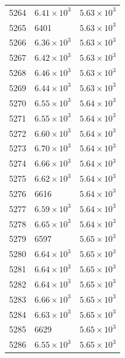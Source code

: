 \begin{table}[H]
\begin{tabular}{lll}
5264 & $\displaystyle 6.41 \times 10^{3}$ & $\displaystyle 5.63 \times 10^{3}$ \\
5265 & 6401 & $\displaystyle 5.63 \times 10^{3}$ \\
5266 & $\displaystyle 6.36 \times 10^{3}$ & $\displaystyle 5.63 \times 10^{3}$ \\
5267 & $\displaystyle 6.42 \times 10^{3}$ & $\displaystyle 5.63 \times 10^{3}$ \\
5268 & $\displaystyle 6.46 \times 10^{3}$ & $\displaystyle 5.63 \times 10^{3}$ \\
5269 & $\displaystyle 6.44 \times 10^{3}$ & $\displaystyle 5.63 \times 10^{3}$ \\
5270 & $\displaystyle 6.55 \times 10^{3}$ & $\displaystyle 5.64 \times 10^{3}$ \\
5271 & $\displaystyle 6.55 \times 10^{3}$ & $\displaystyle 5.64 \times 10^{3}$ \\
5272 & $\displaystyle 6.60 \times 10^{3}$ & $\displaystyle 5.64 \times 10^{3}$ \\
5273 & $\displaystyle 6.70 \times 10^{3}$ & $\displaystyle 5.64 \times 10^{3}$ \\
5274 & $\displaystyle 6.66 \times 10^{3}$ & $\displaystyle 5.64 \times 10^{3}$ \\
5275 & $\displaystyle 6.62 \times 10^{3}$ & $\displaystyle 5.64 \times 10^{3}$ \\
5276 & 6616 & $\displaystyle 5.64 \times 10^{3}$ \\
5277 & $\displaystyle 6.59 \times 10^{3}$ & $\displaystyle 5.64 \times 10^{3}$ \\
5278 & $\displaystyle 6.65 \times 10^{3}$ & $\displaystyle 5.64 \times 10^{3}$ \\
5279 & 6597 & $\displaystyle 5.65 \times 10^{3}$ \\
5280 & $\displaystyle 6.64 \times 10^{3}$ & $\displaystyle 5.65 \times 10^{3}$ \\
5281 & $\displaystyle 6.64 \times 10^{3}$ & $\displaystyle 5.65 \times 10^{3}$ \\
5282 & $\displaystyle 6.64 \times 10^{3}$ & $\displaystyle 5.65 \times 10^{3}$ \\
5283 & $\displaystyle 6.66 \times 10^{3}$ & $\displaystyle 5.65 \times 10^{3}$ \\
5284 & $\displaystyle 6.63 \times 10^{3}$ & $\displaystyle 5.65 \times 10^{3}$ \\
5285 & 6629 & $\displaystyle 5.65 \times 10^{3}$ \\
5286 & $\displaystyle 6.55 \times 10^{3}$ & $\displaystyle 5.65 \times 10^{3}$ \\

\end{tabular}
\end{table}
